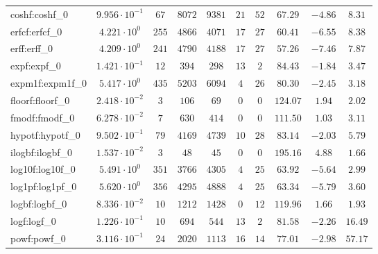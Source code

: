 \begin{tabular}{|l|c|c|c|c|c|c|c|c|c|}
coshf:coshf\_0           & $ 9.956 \cdot 10^{-1} $ & $ 67     $ & $ 8072   $ & $ 9381   $ & $ 21  $ & $ 52  $ & $ 67.29       $ & $ -4.86   $ & $ 8.31    $ \\
erfcf:erfcf\_0           & $ 4.221 \cdot 10^{0}  $ & $ 255    $ & $ 4866   $ & $ 4071   $ & $ 17  $ & $ 27  $ & $ 60.41       $ & $ -6.55   $ & $ 8.38    $ \\
erff:erff\_0             & $ 4.209 \cdot 10^{0}  $ & $ 241    $ & $ 4790   $ & $ 4188   $ & $ 17  $ & $ 27  $ & $ 57.26       $ & $ -7.46   $ & $ 7.87    $ \\
expf:expf\_0             & $ 1.421 \cdot 10^{-1} $ & $ 12     $ & $ 394    $ & $ 298    $ & $ 13  $ & $ 2   $ & $ 84.43       $ & $ -1.84   $ & $ 3.47    $ \\
expm1f:expm1f\_0         & $ 5.417 \cdot 10^{0}  $ & $ 435    $ & $ 5203   $ & $ 6094   $ & $ 4   $ & $ 26  $ & $ 80.30       $ & $ -2.45   $ & $ 3.18    $ \\
floorf:floorf\_0         & $ 2.418 \cdot 10^{-2} $ & $ 3      $ & $ 106    $ & $ 69     $ & $ 0   $ & $ 0   $ & $ 124.07      $ & $ 1.94    $ & $ 2.02    $ \\
fmodf:fmodf\_0           & $ 6.278 \cdot 10^{-2} $ & $ 7      $ & $ 630    $ & $ 414    $ & $ 0   $ & $ 0   $ & $ 111.50      $ & $ 1.03    $ & $ 3.11    $ \\
hypotf:hypotf\_0         & $ 9.502 \cdot 10^{-1} $ & $ 79     $ & $ 4169   $ & $ 4739   $ & $ 10  $ & $ 28  $ & $ 83.14       $ & $ -2.03   $ & $ 5.79    $ \\
ilogbf:ilogbf\_0         & $ 1.537 \cdot 10^{-2} $ & $ 3      $ & $ 48     $ & $ 45     $ & $ 0   $ & $ 0   $ & $ 195.16      $ & $ 4.88    $ & $ 1.66    $ \\
log10f:log10f\_0         & $ 5.491 \cdot 10^{0}  $ & $ 351    $ & $ 3766   $ & $ 4305   $ & $ 4   $ & $ 25  $ & $ 63.92       $ & $ -5.64   $ & $ 2.99    $ \\
log1pf:log1pf\_0         & $ 5.620 \cdot 10^{0}  $ & $ 356    $ & $ 4295   $ & $ 4888   $ & $ 4   $ & $ 25  $ & $ 63.34       $ & $ -5.79   $ & $ 3.60    $ \\
logbf:logbf\_0           & $ 8.336 \cdot 10^{-2} $ & $ 10     $ & $ 1212   $ & $ 1428   $ & $ 0   $ & $ 12  $ & $ 119.96      $ & $ 1.66    $ & $ 1.93    $ \\
logf:logf\_0             & $ 1.226 \cdot 10^{-1} $ & $ 10     $ & $ 694    $ & $ 544    $ & $ 13  $ & $ 2   $ & $ 81.58       $ & $ -2.26   $ & $ 16.49   $ \\
powf:powf\_0             & $ 3.116 \cdot 10^{-1} $ & $ 24     $ & $ 2020   $ & $ 1113   $ & $ 16  $ & $ 14  $ & $ 77.01       $ & $ -2.98   $ & $ 57.17   $ \\

\end{tabular}
